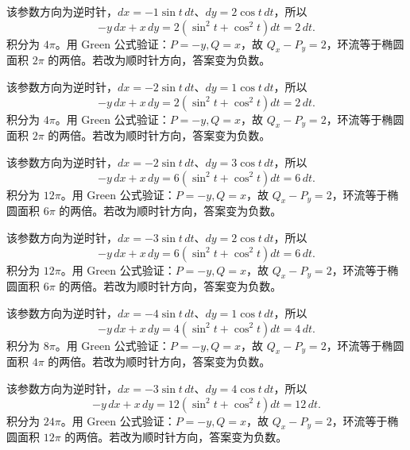 \documentclass[12pt,fontset=fandol]{ctexart}
\begin{document}
\begin{solve}\label{ans:c41q8}
该参数方向为逆时针，$dx=-1\sin t\,dt$、$dy=2\cos t\,dt$，所以
\[
-y\,dx+x\,dy=2(\sin^2t+\cos^2t)dt=2\,dt.
\]
积分为 $4\pi$。用 Green 公式验证：$P=-y,Q=x$，故 $Q_x-P_y=2$，环流等于椭圆面积 $2\pi$ 的两倍。若改为顺时针方向，答案变为负数。
\end{solve}

\begin{solve}\label{ans:c41q9}
该参数方向为逆时针，$dx=-2\sin t\,dt$、$dy=1\cos t\,dt$，所以
\[
-y\,dx+x\,dy=2(\sin^2t+\cos^2t)dt=2\,dt.
\]
积分为 $4\pi$。用 Green 公式验证：$P=-y,Q=x$，故 $Q_x-P_y=2$，环流等于椭圆面积 $2\pi$ 的两倍。若改为顺时针方向，答案变为负数。
\end{solve}

\begin{solve}\label{ans:c41q10}
该参数方向为逆时针，$dx=-2\sin t\,dt$、$dy=3\cos t\,dt$，所以
\[
-y\,dx+x\,dy=6(\sin^2t+\cos^2t)dt=6\,dt.
\]
积分为 $12\pi$。用 Green 公式验证：$P=-y,Q=x$，故 $Q_x-P_y=2$，环流等于椭圆面积 $6\pi$ 的两倍。若改为顺时针方向，答案变为负数。
\end{solve}

\begin{solve}\label{ans:c41q11}
该参数方向为逆时针，$dx=-3\sin t\,dt$、$dy=2\cos t\,dt$，所以
\[
-y\,dx+x\,dy=6(\sin^2t+\cos^2t)dt=6\,dt.
\]
积分为 $12\pi$。用 Green 公式验证：$P=-y,Q=x$，故 $Q_x-P_y=2$，环流等于椭圆面积 $6\pi$ 的两倍。若改为顺时针方向，答案变为负数。
\end{solve}

\begin{solve}\label{ans:c41q12}
该参数方向为逆时针，$dx=-4\sin t\,dt$、$dy=1\cos t\,dt$，所以
\[
-y\,dx+x\,dy=4(\sin^2t+\cos^2t)dt=4\,dt.
\]
积分为 $8\pi$。用 Green 公式验证：$P=-y,Q=x$，故 $Q_x-P_y=2$，环流等于椭圆面积 $4\pi$ 的两倍。若改为顺时针方向，答案变为负数。
\end{solve}

\begin{solve}\label{ans:c41q13}
该参数方向为逆时针，$dx=-3\sin t\,dt$、$dy=4\cos t\,dt$，所以
\[
-y\,dx+x\,dy=12(\sin^2t+\cos^2t)dt=12\,dt.
\]
积分为 $24\pi$。用 Green 公式验证：$P=-y,Q=x$，故 $Q_x-P_y=2$，环流等于椭圆面积 $12\pi$ 的两倍。若改为顺时针方向，答案变为负数。
\end{solve}
\end{document}
